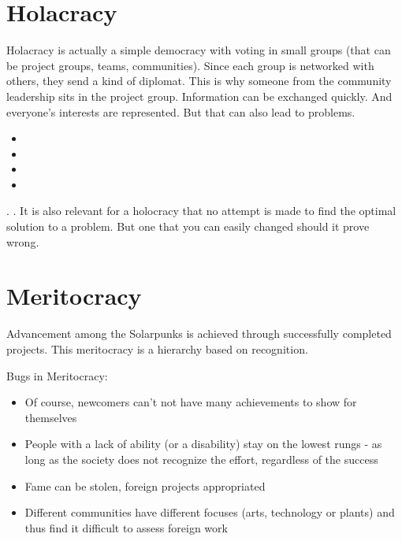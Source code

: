\section{Holacracy}
Holacracy is actually a simple democracy with voting in small groups (that can be project groups, teams, communities). Since each group is networked with others, they send a kind of diplomat. This is why someone from the community leadership sits in the project group. Information can be exchanged quickly. And everyone's interests are represented. But that can also lead to problems.

\begin{solartalk}[]
    \begin{itemize}
        \item {}
        \item {}
        \item {}
        \item {}
    \end{itemize}
\end{solartalk}

. . It is also relevant for a holocracy that no attempt is made to find the optimal solution to a problem.
But one that you can easily changed should it prove wrong.

\section{Meritocracy}
Advancement among the Solarpunks is achieved through successfully completed projects. This meritocracy is a hierarchy based on recognition.

Bugs in Meritocracy:

\begin{itemize}
    \item Of course, newcomers can't not have many achievements to show for themselves
    \item People with a lack of ability (or a disability) stay on the lowest rungs - as long as the society does not recognize the effort, regardless of the success
    \item Fame can be stolen, foreign projects appropriated
    \item Different communities have different focuses (arts, technology or plants) and thus find it difficult to assess foreign work
\end{itemize}

